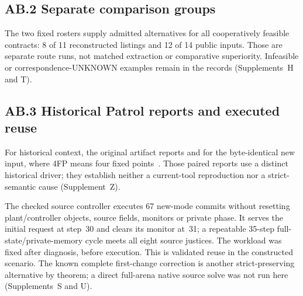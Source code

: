 \subsection*{AB.2 Separate comparison groups}
The two fixed rosters supply admitted alternatives for all cooperatively
feasible contracts: 8 of 11 reconstructed listings and 12 of 14 public inputs.
Those are separate route runs, not matched extraction or comparative
superiority. Infeasible or correspondence-UNKNOWN examples remain in
the records (Supplements~H and T).



\subsection*{AB.3 Historical Patrol reports and executed reuse}
For historical context, the original artifact reports
 and  for the byte-identical new
input, where 4FP means four fixed points~\cite{kindartifact}.
Those paired reports use a distinct historical driver; they establish
neither a current-tool reproduction nor a strict-semantic cause (Supplement~Z).

The checked source controller executes 67 new-mode commits without
resetting plant/controller objects, source fields, monitors or private
phase. It serves the initial request at step~30 and clears its monitor
at~31; a repeatable 35-step full-state/private-memory cycle meets all
eight source justices. The workload was fixed after diagnosis, before
execution. This is validated reuse in the constructed scenario.
The known complete first-change correction is another strict-preserving
alternative by theorem; a direct full-arena native source solve was not
run here (Supplements~S and U).
